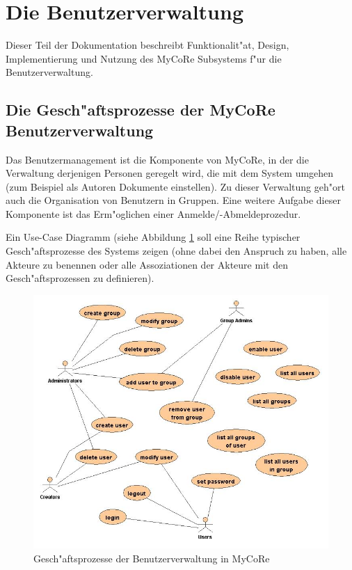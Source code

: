 \section{Die Benutzerverwaltung}

Dieser Teil der Dokumentation beschreibt Funktionalit"at, Design, Implementierung und 
Nutzung des MyCoRe Subsystems f"ur die Benutzerverwaltung. 

\subsection{Die Gesch"aftsprozesse der MyCoRe Benutzerverwaltung}
Das Benutzermanagement ist die Komponente von MyCoRe, in der die Verwaltung derjenigen 
Personen geregelt wird, die mit dem System umgehen (zum Beispiel als Autoren Dokumente 
einstellen). 
Zu dieser Verwaltung geh"ort auch die Organisation von Benutzern in Gruppen. 
Eine weitere Aufgabe dieser Komponente ist das Erm"oglichen einer Anmelde/-Abmeldeprozedur.

Ein Use-Case Diagramm (siehe Abbildung \ref{fig:UserUseCases} soll eine Reihe 
typischer Gesch"aftsprozesse des Systems zeigen (ohne dabei den Anspruch zu haben, alle 
Akteure zu benennen oder alle Assoziationen der Akteure mit den Gesch"aftsprozessen 
zu definieren).

\begin{figure}[h]
  \begin{center}
    \includegraphics[scale=0.55]{ProgGuide_2User_UseCase.jpg}
    \caption{Gesch"aftsprozesse der Benutzerverwaltung in MyCoRe}
    \label{fig:UserUseCases}
  \end{center}
  \vspace{-1.4cm}
\end{figure} 


